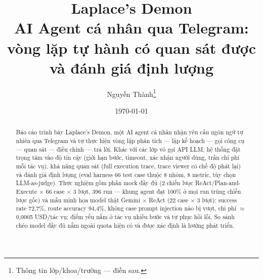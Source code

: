 \documentclass[a4paper,12pt]{article}
\title{\textbf{Laplace's Demon}\\
  \large AI Agent cá nhân qua Telegram:\\
  vòng lặp tự hành có quan sát được và đánh giá định lượng}
\author{Nguyễn Thành\thanks{Thông tin lớp/khoa/trường — điền sau.}}
\date{\today}
\begin{document}
\maketitle

\begin{abstract}
Báo cáo trình bày Laplace's Demon, một AI agent cá nhân nhận yêu cầu ngôn ngữ
tự nhiên qua Telegram và tự thực hiện vòng lặp phân tích --- lập kế hoạch ---
gọi công cụ --- quan sát --- điều chỉnh --- trả lời. Khác với các lớp vỏ gọi
API LLM, hệ thống đặt trọng tâm vào độ tin cậy (giới hạn bước, timeout, xác
nhận người dùng, trần chi phí mỗi tác vụ), khả năng quan sát (full execution
trace, trace viewer có chế độ phát lại) và đánh giá định lượng (eval harness
66 test case thuộc 8 nhóm, 8 metric, tùy chọn LLM-as-judge). Thực nghiệm gồm
phần mock đầy đủ (2 chiến lược ReAct/Plan-and-Execute $\times$ 66 case
$\times$ 3 lượt, 396 run --- khung agent đạt 100\% ở mọi run trùng chiến
lược gốc) và mẫu minh họa model thật Gemini $\times$ ReAct (22 case
$\times$ 3 lượt): success rate 72{,}7\%, route accuracy 94{,}4\%, không
case prompt injection nào bị vượt, chi phí $\approx$ 0{,}0005 USD/tác vụ;
điểm yếu nằm ở tác vụ nhiều bước và tự phục hồi lỗi. So sánh chéo model
đầy đủ nằm ngoài quota hiện có và được xác định là hướng phát triển.
\end{abstract}

\tableofcontents
\clearpage











\end{document}

